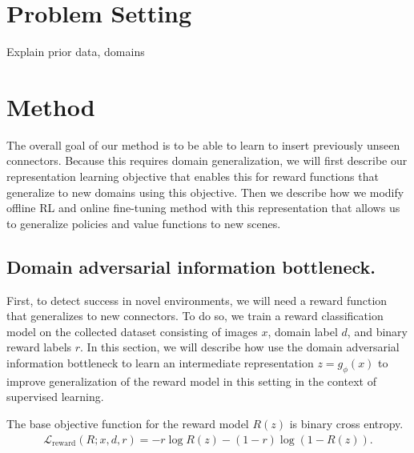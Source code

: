 


\section{Problem Setting}

Explain prior data, domains

\section{Method}

The overall goal of our method is to be able to learn to insert previously unseen connectors. Because this requires domain generalization, we will first describe our representation learning objective that enables this for reward functions that generalize to new domains using this objective. Then we describe how we modify offline RL and online fine-tuning method with this representation that allows us to generalize policies and value functions to new scenes.

\subsection{Domain adversarial information bottleneck.}
\label{sec:reward}

First, to detect success in novel environments, we will need a reward function that generalizes to new connectors. To do so, we train a reward classification model on the collected dataset consisting of images $x$, domain label $d$, and binary reward labels $r$. In this section, we will describe how use the domain adversarial information bottleneck to learn an intermediate representation $z=g_\phi(x)$ to improve generalization of the reward model in this setting in the context of supervised learning.

The base objective function for the reward model $R(z)$ is binary cross entropy. 
\begin{eqnarray}
\mathcal{L}_\text{reward}(R; x, d, r) = -r\log R(z) - (1-r)\log(1-R(z)).
\end{eqnarray}

